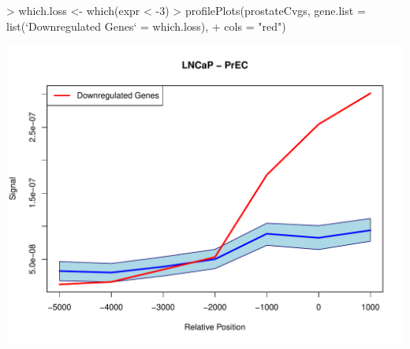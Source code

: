 \begin{Schunk}
\begin{Sinput}
> which.loss <- which(expr < -3)
> profilePlots(prostateCvgs, gene.list = list(`Downregulated Genes` = which.loss), 
+     cols = "red")
\end{Sinput}
\end{Schunk}
\includegraphics{profPlots-profPlots}
